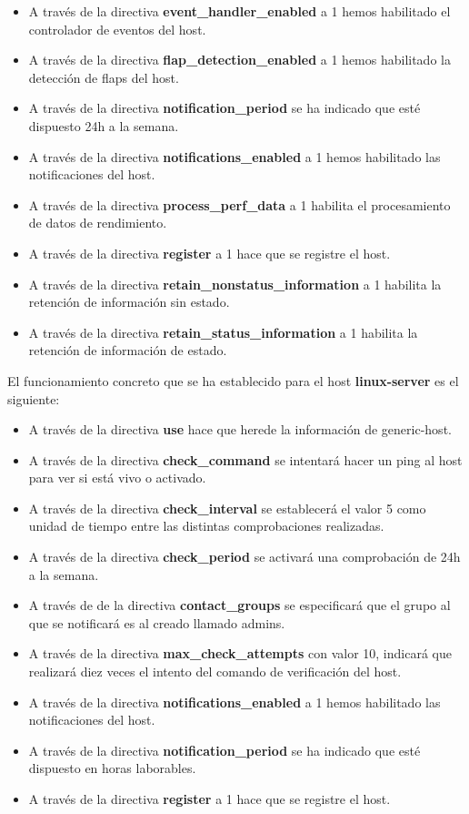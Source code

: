 \begin{itemize}
	\item A través de la directiva \textbf{event\_handler\_enabled} a 1 hemos habilitado el controlador de eventos del host.
	\item A través de la directiva \textbf{flap\_detection\_enabled} a 1 hemos habilitado la detección de flaps del host.
	\item A través de la directiva \textbf{notification\_period} se ha indicado que esté dispuesto 24h a la semana.
	\item A través de la directiva \textbf{notifications\_enabled} a 1 hemos habilitado las notificaciones del host.
	\item A través de la directiva \textbf{process\_perf\_data} a 1 habilita el procesamiento de datos de rendimiento.
	\item A través de la directiva \textbf{register} a 1 hace que se registre el host.
	\item A través de la directiva \textbf{retain\_nonstatus\_information} a 1 habilita la retención de información sin estado.
	\item A través de la directiva \textbf{retain\_status\_information} a 1 habilita la retención de información de estado.
\end{itemize}

El funcionamiento concreto que se ha establecido para el host \textbf{linux-server} es el siguiente:

\begin{itemize}
	\item A través de la directiva \textbf{use} hace que herede la información de generic-host.
	\item A través de la directiva \textbf{check\_command} se intentará hacer un ping al host para ver si está vivo o activado.
	\item A través de la directiva \textbf{check\_interval} se establecerá el valor 5 como unidad de tiempo entre las distintas comprobaciones realizadas.
	\item A través de la directiva \textbf{check\_period} se activará una comprobación de 24h a la semana.
	\item A través de de la directiva \textbf{contact\_groups} se especificará que el grupo al que se notificará es al creado llamado admins.
	\item A través de la directiva \textbf{max\_check\_attempts} con valor 10, indicará que realizará diez veces el intento del comando de verificación del host.
	\newpage
	\item A través de la directiva \textbf{notifications\_enabled} a 1 hemos habilitado las notificaciones del host.
	\item A través de la directiva \textbf{notification\_period} se ha indicado que esté dispuesto en horas laborables.
	\item A través de la directiva \textbf{register} a 1 hace que se registre el host.
	
\end{itemize}

